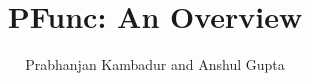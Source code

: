 \documentclass[11pt]{article}
\title{PFunc: An Overview}
\author{Prabhanjan Kambadur and Anshul Gupta}
\begin{document}
\maketitle

\pagebreak



\pagebreak



\pagebreak



\pagebreak



\pagebreak



\pagebreak



\pagebreak



\pagebreak



\pagebreak



\pagebreak


\end{document}
